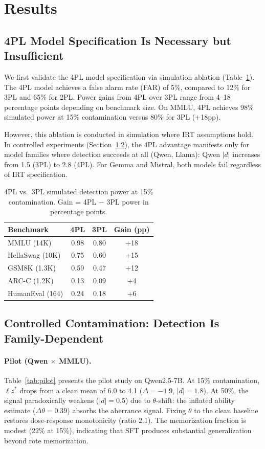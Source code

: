\documentclass[11pt,a4paper]{article}
\newcommand{\lzstar}{\ensuremath{\ell z^*}}
\begin{document}
\section{Results}

\subsection{4PL Model Specification Is Necessary but Insufficient}
\label{sec:4pl_ablation}

We first validate the 4PL model specification via simulation ablation (Table~\ref{tab:4pl_ablation}).
The 4PL model achieves a false alarm rate (FAR) of 5\%, compared to 12\% for 3PL and 65\% for 2PL.
Power gains from 4PL over 3PL range from 4--18 percentage points depending on benchmark size.
On MMLU, 4PL achieves 98\% simulated power at 15\% contamination versus 80\% for 3PL ($+$18pp).

However, this ablation is conducted in simulation where IRT assumptions hold.
In controlled experiments (Section~\ref{sec:ctrl_contam}), the 4PL advantage manifests only for model families where detection succeeds at all (Qwen, Llama): Qwen $|d|$ increases from 1.5 (3PL) to 2.8 (4PL).
For Gemma and Mistral, both models fail regardless of IRT specification.

\begin{table}[t]
\centering
\small
\caption{4PL vs.\ 3PL simulated detection power at 15\% contamination. Gain = 4PL $-$ 3PL power in percentage points.}
\label{tab:4pl_ablation}
\begin{tabular}{lccc}
\toprule
\textbf{Benchmark} & \textbf{4PL} & \textbf{3PL} & \textbf{Gain (pp)} \\
\midrule
MMLU (14K) & 0.98 & 0.80 & +18 \\
HellaSwag (10K) & 0.75 & 0.60 & +15 \\
GSM8K (1.3K) & 0.59 & 0.47 & +12 \\
ARC-C (1.2K) & 0.13 & 0.09 & +4 \\
HumanEval (164) & 0.24 & 0.18 & +6 \\
\bottomrule
\end{tabular}
\end{table}

\subsection{Controlled Contamination: Detection Is Family-Dependent}
\label{sec:ctrl_contam}

\paragraph{Pilot (Qwen $\times$ MMLU).}
Table~\ref{tab:pilot} presents the pilot study on Qwen2.5-7B.
At 15\% contamination, $\lzstar$ drops from a clean mean of 6.0 to 4.1 ($\Delta=-1.9$, $|d|=1.8$).
At 50\%, the signal paradoxically weakens ($|d|=0.5$) due to $\theta$-shift: the inflated ability estimate ($\Delta\theta=0.39$) absorbs the aberrance signal.
Fixing $\theta$ to the clean baseline restores dose-response monotonicity (ratio 2.1).
The memorization fraction is modest (22\% at 15\%), indicating that SFT produces substantial generalization beyond rote memorization.
\end{document}

